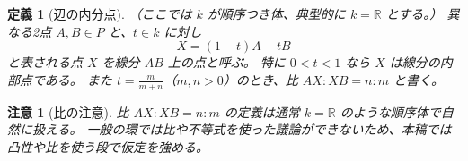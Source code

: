\documentclass[a4paper,12pt]{bxjsbook}
\theoremstyle{theorem}
\newtheorem{definition}[theorem]{定義}
\newtheorem{remark}[theorem]{注意}
\newcommand{\dotminus}{\mathbin{\dot{-}}}
\begin{document}
    \begin{definition}[辺の内分点]
        （ここでは $k$ が順序つき体、典型的に $k=\mathbb{R}$ とする。）
        異なる2点 $A,B\in P$ と、$t\in k$ に対し
        \[
        X = (1-t)A + tB
        \]
        と表される点 $X$ を線分 $AB$ 上の点と呼ぶ。
        特に $0<t<1$ なら $X$ は線分の内部点である。
        また $t=\frac{m}{m+n}$（$m,n>0$）のとき、比 $AX:XB=n:m$ と書く。
    \end{definition}

    \begin{remark}[比の注意]
        比 $AX:XB=n:m$ の定義は通常 $k=\mathbb{R}$ のような順序体で自然に扱える。
        一般の環では比や不等式を使った議論ができないため、本稿では凸性や比を使う段で仮定を強める。
    \end{remark}


\end{document}
